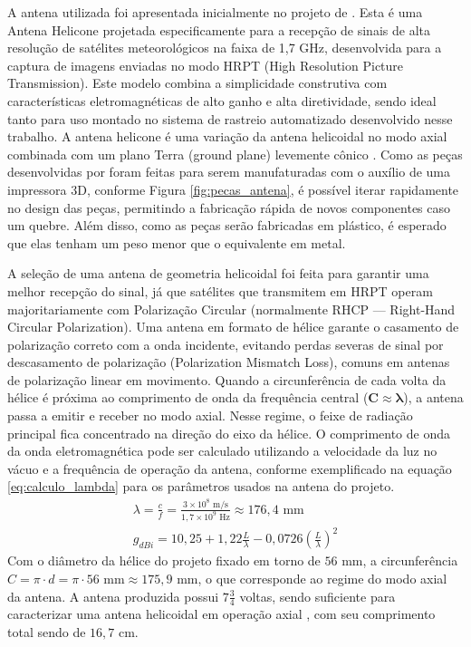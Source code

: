 A antena utilizada foi apresentada inicialmente no projeto de \cite{tonito2024}. Esta é uma Antena Helicone projetada especificamente para a recepção de sinais de alta resolução de satélites meteorológicos na faixa de 1,7 GHz, desenvolvida para a captura de imagens enviadas no modo HRPT (High Resolution Picture Transmission).
Este modelo combina a simplicidade construtiva com características eletromagnéticas de alto ganho e alta diretividade, sendo ideal tanto para uso  montado no sistema de rastreio automatizado desenvolvido nesse trabalho.
A antena helicone é uma variação da antena helicoidal no modo axial combinada com um plano Terra (ground plane) levemente cônico \cite{kraus2002antennas}.
Como as peças desenvolvidas por \cite{tonito2024} foram feitas para serem manufaturadas com o auxílio de uma impressora 3D, conforme Figura \ref{fig:pecas_antena}, é possível iterar rapidamente no design das peças, permitindo a fabricação rápida de novos componentes caso um quebre.
Além disso, como as peças serão fabricadas em plástico, é esperado que elas tenham um peso menor que o equivalente em metal.

A seleção de uma antena de geometria helicoidal foi feita para garantir uma melhor recepção do sinal, já que satélites que transmitem em HRPT operam majoritariamente com Polarização Circular (normalmente RHCP — Right-Hand Circular Polarization).
Uma antena em formato de hélice garante o casamento de polarização correto com a onda incidente, evitando perdas severas de sinal por descasamento de polarização (Polarization Mismatch Loss), comuns em antenas de polarização linear em movimento.
Quando a circunferência de cada volta da hélice é próxima ao comprimento de onda da frequência central ($\mathbf{C \approx \lambda}$), a antena passa a emitir e receber no modo axial.
Nesse regime, o feixe de radiação principal fica concentrado na direção do eixo da hélice. O comprimento de onda da onda eletromagnética pode ser calculado utilizando a velocidade da luz no vácuo e a frequência de operação da antena, conforme exemplificado na equação \eqref{eq:calculo_lambda} para os parâmetros usados na antena do projeto.
\begin{align}
    \lambda = \frac{c}{f} = \frac{3 \times 10^8\text{ m/s}}{1,7 \times 10^9\text{ Hz}} \approx 176,4\text{ mm}\label{eq:calculo_lambda} \\
    g_{dBi} = 10,25 + 1,22\frac{L}{\lambda} - 0,0726(\frac{L}{\lambda})^2
\end{align}
Com o diâmetro da hélice do projeto fixado em torno de $56\text{ mm}$, a circunferência $C = \pi \cdot d = \pi \cdot 56\text{ mm} \approx 175,9\text{ mm}$, o que corresponde ao regime do modo axial da antena.
A antena produzida possui $7\frac{3}{4}$ voltas, sendo suficiente para caracterizar uma antena helicoidal em operação axial \cite{djordjevic2006optimization}, com seu comprimento total sendo de $16,7\text{ cm}$.

